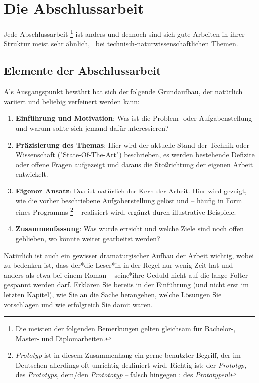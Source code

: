 \chapter{Die Abschlussarbeit}
\label{cha:Abschlussarbeit}

Jede Abschlussarbeit%
\footnote{Die meisten der folgenden Bemerkungen gelten gleichsam für Bachelor-, Master- und Diplomarbeiten.} 
ist anders und dennoch sind sich gute
Arbeiten in ihrer Struktur meist sehr ähnlich, \va\ bei
technisch-natur\-wissen\-schaft\-lichen Themen. 

\section{Elemente der Abschlussarbeit}

Als Ausgangspunkt bewährt hat sich der folgende Grundaufbau, der natürlich 
vari\-iert und beliebig verfeinert werden kann:
%
\begin{enumerate}
\item \textbf{Einführung und Motivation}: Was ist die Problem- oder Aufgabenstellung und
warum sollte sich jemand dafür interessieren?
\item \textbf{Präzisierung des Themas}: Hier wird der aktuelle Stand der Technik
oder Wissenschaft ("State-Of-The-Art") beschrieben, es werden bestehende
Defizite oder offene Fragen aufgezeigt und daraus die
Stoßrichtung der eigenen Arbeit entwickelt.
\item \textbf{Eigener Ansatz}: Das ist natürlich der Kern der Arbeit. Hier
wird gezeigt, wie die vorher beschriebene Aufgabenstellung gelöst und --
häufig in Form eines Programms%
\footnote{\emph{Prototyp} ist in diesem Zusammenhang ein gerne benutzter Begriff, der im Deutschen
allerdings oft unrichtig dekliniert wird. Richtig ist: der \emph{Prototyp}, des \emph{Prototyps}, dem/den \emph{Protototyp} -- falsch hingegen \zB: des \emph{Prototyp\underline{en}}!
} --
realisiert wird, ergänzt durch illustrative Beispiele.
\item \textbf{Zusammenfassung}: Was wurde erreicht und welche Ziele sind
noch offen geblieben, wo könnte weiter gearbeitet werden?
\end{enumerate}
%
Natürlich ist auch ein gewisser dramaturgischer Aufbau der Arbeit
wichtig, wobei zu bedenken ist, dass der*die Leser*in in der Regel nur
wenig Zeit hat und -- anders als etwa bei einem Roman -- seine*ihre
Geduld nicht auf die lange Folter gespannt werden darf. Erklären
Sie bereits in der Einführung (und nicht erst im letzten Kapitel),
wie Sie an die Sache herangehen, welche Lösungen Sie vorschlagen
und wie erfolgreich Sie damit waren.

